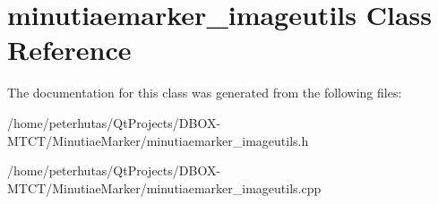 \hypertarget{classminutiaemarker__imageutils}{}\section{minutiaemarker\+\_\+imageutils Class Reference}
\label{classminutiaemarker__imageutils}


The documentation for this class was generated from the following files\+:\begin{DoxyCompactItemize}
\item 
/home/peterhutas/\+Qt\+Projects/\+D\+B\+O\+X-\/\+M\+T\+C\+T/\+Minutiae\+Marker/minutiaemarker\+\_\+imageutils.\+h\item 
/home/peterhutas/\+Qt\+Projects/\+D\+B\+O\+X-\/\+M\+T\+C\+T/\+Minutiae\+Marker/minutiaemarker\+\_\+imageutils.\+cpp\end{DoxyCompactItemize}

